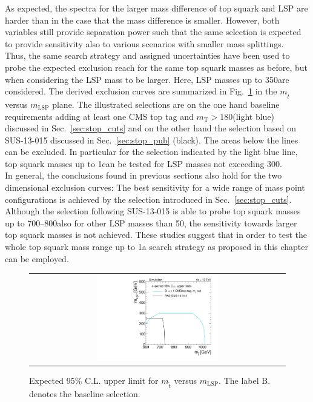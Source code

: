 As expected, the spectra for the larger mass difference of top squark and LSP are harder than in the case that the mass difference is smaller. However, both variables still provide separation power such that the same selection is expected to provide sensitivity also to various scenarios with smaller mass splittings. 
\\
Thus, the same search strategy and assigned uncertainties have been used to probe the expected exclusion reach for the same top squark masses as before, but when considering the LSP mass to be larger. Here, LSP masses up to 350\gev are considered. The derived exclusion curves are summarized in Fig.~\ref{fig:stop_2Dlimit} in the $m_{\tilde{t}}$ versus $m_\mathrm{LSP}$ plane. The illustrated selections are on the one hand baseline requirements adding at least one CMS top tag and $m_\mathrm{T} > 180$\gev (light blue) discussed in Sec.~\ref{sec:stop_cuts} and on the other hand the selection based on SUS-13-015 discussed in Sec.~\ref{sec:stop_pub} (black). The areas below the lines can be excluded. In particular for the selection indicated by the light blue line, top squark masses up to 1\tev can be tested for LSP masses not exceeding 300\gev. \\
In general, the conclusions found in previous sections also hold for the two dimensional exclusion curves: The best sensitivity for a wide range of mass point configurations is achieved by the selection introduced in Sec.~\ref{sec:stop_cuts}. Although the selection following SUS-13-015 is able to probe top squark masses up to 700--800\gev also for other LSP masses than 50\gev, the sensitivity towards larger top squark masses is not achieved. These studies suggest that in order to test the whole top squark mass range up to 1\tev a search strategy as proposed in this chapter can be employed. 
\begin{figure}[!t]
  \centering
  \begin{tabular}{c}
                \includegraphics[width=0.49\textwidth]{figures/2Dlimitplot.pdf} 
  \end{tabular}
  \caption{Expected 95\% C.L. upper limit for $m_{\tilde{t}}$ versus $m_\mathrm{LSP}$. The label B. denotes the baseline selection.}
  \label{fig:stop_2Dlimit}
\end{figure}  

